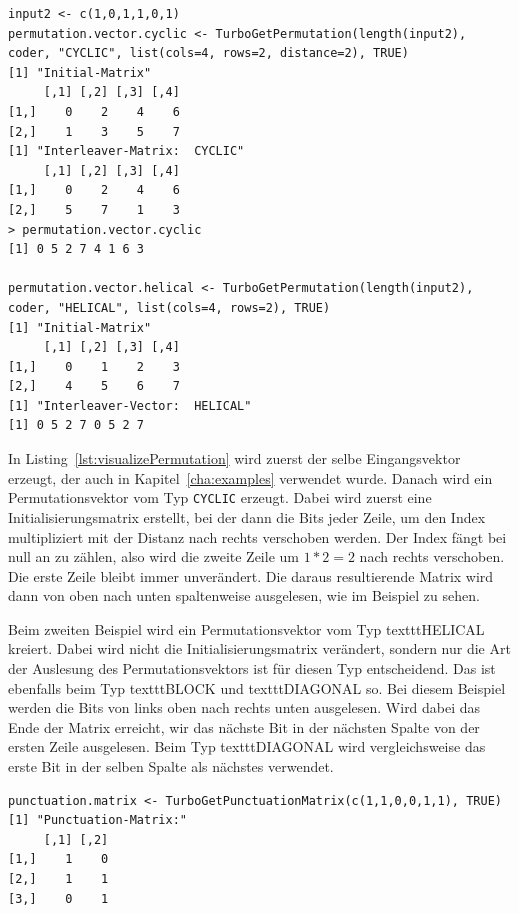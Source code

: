 \begin{lstlisting}[caption=Visualisierung der Permutationsmatrix, label={lst:visualizePermutation}, float=th]
input2 <- c(1,0,1,1,0,1)
permutation.vector.cyclic <- TurboGetPermutation(length(input2), coder, "CYCLIC", list(cols=4, rows=2, distance=2), TRUE)
[1] "Initial-Matrix"
     [,1] [,2] [,3] [,4]
[1,]    0    2    4    6
[2,]    1    3    5    7
[1] "Interleaver-Matrix:  CYCLIC"
     [,1] [,2] [,3] [,4]
[1,]    0    2    4    6
[2,]    5    7    1    3
> permutation.vector.cyclic
[1] 0 5 2 7 4 1 6 3

permutation.vector.helical <- TurboGetPermutation(length(input2), coder, "HELICAL", list(cols=4, rows=2), TRUE)
[1] "Initial-Matrix"
     [,1] [,2] [,3] [,4]
[1,]    0    1    2    3
[2,]    4    5    6    7
[1] "Interleaver-Vector:  HELICAL"
[1] 0 5 2 7 0 5 2 7
\end{lstlisting}

In Listing~\ref{lst:visualizePermutation} wird zuerst der selbe Eingangsvektor erzeugt, der auch in Kapitel~\ref{cha:examples} verwendet wurde. Danach wird ein Permutationsvektor vom Typ \texttt{CYCLIC} erzeugt. Dabei wird zuerst eine Initialisierungsmatrix erstellt, bei der dann die Bits jeder Zeile, um den Index multipliziert mit der Distanz nach rechts verschoben werden. Der Index fängt bei null an zu zählen, also wird die zweite Zeile um $1*2 = 2$ nach rechts verschoben. Die erste Zeile bleibt immer unverändert. Die daraus resultierende Matrix wird dann von oben nach unten spaltenweise ausgelesen, wie im Beispiel zu sehen.

Beim zweiten Beispiel wird ein Permutationsvektor vom Typ texttt{HELICAL} kreiert. Dabei wird nicht die Initialisierungsmatrix verändert, sondern nur die Art der Auslesung des Permutationsvektors ist für diesen Typ entscheidend. Das ist ebenfalls beim Typ texttt{BLOCK} und texttt{DIAGONAL} so. Bei diesem Beispiel werden die Bits von links oben nach rechts unten ausgelesen. Wird dabei das Ende der Matrix erreicht, wir das nächste Bit in der nächsten Spalte von der ersten Zeile ausgelesen. Beim Typ texttt{DIAGONAL} wird vergleichsweise das erste Bit in der selben Spalte als nächstes verwendet.

\begin{lstlisting}[caption=Visualisierung der Punktierungssmatrix, label={lst:visualizePunctuationMatrix}, float=th]
punctuation.matrix <- TurboGetPunctuationMatrix(c(1,1,0,0,1,1), TRUE)
[1] "Punctuation-Matrix:"
     [,1] [,2]
[1,]    1    0
[2,]    1    1
[3,]    0    1
\end{lstlisting}

